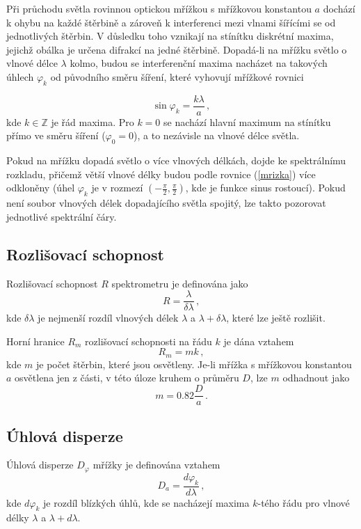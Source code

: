 \documentclass{../concepts/titul_protokol_p/prepareprotokol} %
\begin{document}
Při průchodu světla rovinnou optickou mřížkou s mřížkovou konstantou $a$
dochází k ohybu na každé štěrbině a zároveň k interferenci mezi vlnami
šířícími se od jednotlivých štěrbin. V důsledku toho vznikají na stínítku
diskrétní maxima, jejichž obálka je určena difrakcí na jedné štěrbině.
Dopadá-li na mřížku světlo o vlnové délce $\lambda$ kolmo, budou se
interferenční maxima nacházet na takových úhlech $\varphi_k$ od původního směru
šíření, které vyhovují mřížkové rovnici \cite{pokyny}

\begin{equation}\label{mrizka}
    \sin \varphi_k = \frac{k \lambda}{a} \, ,
\end{equation}
kde $k \in \mathbb{Z}$ je řád maxima. Pro $k=0$ se nachází hlavní
maximum na stínítku přímo ve směru šíření ($\varphi_0 = 0$), a to
nezávisle na vlnové délce světla.

Pokud na mřížku dopadá světlo o více vlnových délkách, dojde ke
spektrálnímu rozkladu, přičemž větší vlnové délky budou podle rovnice
(\ref{mrizka}) více odkloněny (úhel $\varphi_k$ je v rozmezí
$\left( -\frac{\pi}{2}, \frac{\pi}{2} \right)$, kde je funkce sinus rostoucí).
Pokud není soubor vlnových délek dopadajícího světla spojitý, 
lze takto pozorovat jednotlivé spektrální čáry.

\subsection{Rozlišovací schopnost}
Rozlišovací schopnost $R$ spektrometru je definována jako \cite{pokyny}
\begin{equation}\label{rozliseni}
    R = \frac{\lambda}{\delta \lambda} \, ,
\end{equation}
kde $\delta \lambda$ je nejmenší rozdíl vlnových délek $\lambda$ a
$\lambda + \delta \lambda$, které lze ještě rozlišit.

Horní hranice $R_m$ rozlišovací schopnosti na řádu $k$ je dána vztahem 
\cite{pokyny}
\begin{equation}\label{maxrozliseni}
    R_m = m k \, ,
\end{equation}
kde $m$ je počet štěrbin, které jsou osvětleny. Je-li mřížka s mřížkovou
konstantou $a$ osvětlena jen z části, v této úloze kruhem o průměru
$D$, lze $m$ odhadnout jako \cite{pokyny}
\begin{equation}\label{m}
    m = 0.82 \frac{D}{a} \, .
\end{equation}

\subsection{Úhlová disperze}
Úhlová disperze $D_\varphi$ mřížky je definována vztahem \cite{pokyny}
\begin{equation}\label{disperzeexp}
    D_a = \frac{d \varphi_k}{d \lambda} \, ,
\end{equation}
kde $d \varphi_k$ je rozdíl blízkých úhlů, kde se nacházejí maxima
$k$-tého řádu pro vlnové délky $\lambda$ a $\lambda + d \lambda$.
\end{document}
